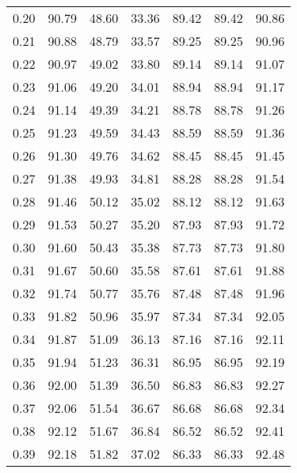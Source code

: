 \begin{tabular}{|c|c|c|c|c|c|c|}
      0.20 &     90.79 &     48.60 &      33.36 &   89.42 &      89.42 &         90.86 \\
      0.21 &     90.88 &     48.79 &      33.57 &   89.25 &      89.25 &         90.96 \\
      0.22 &     90.97 &     49.02 &      33.80 &   89.14 &      89.14 &         91.07 \\
      0.23 &     91.06 &     49.20 &      34.01 &   88.94 &      88.94 &         91.17 \\
      0.24 &     91.14 &     49.39 &      34.21 &   88.78 &      88.78 &         91.26 \\
      0.25 &     91.23 &     49.59 &      34.43 &   88.59 &      88.59 &         91.36 \\
      0.26 &     91.30 &     49.76 &      34.62 &   88.45 &      88.45 &         91.45 \\
      0.27 &     91.38 &     49.93 &      34.81 &   88.28 &      88.28 &         91.54 \\
      0.28 &     91.46 &     50.12 &      35.02 &   88.12 &      88.12 &         91.63 \\
      0.29 &     91.53 &     50.27 &      35.20 &   87.93 &      87.93 &         91.72 \\
      0.30 &     91.60 &     50.43 &      35.38 &   87.73 &      87.73 &         91.80 \\
      0.31 &     91.67 &     50.60 &      35.58 &   87.61 &      87.61 &         91.88 \\
      0.32 &     91.74 &     50.77 &      35.76 &   87.48 &      87.48 &         91.96 \\
      0.33 &     91.82 &     50.96 &      35.97 &   87.34 &      87.34 &         92.05 \\
      0.34 &     91.87 &     51.09 &      36.13 &   87.16 &      87.16 &         92.11 \\
      0.35 &     91.94 &     51.23 &      36.31 &   86.95 &      86.95 &         92.19 \\
      0.36 &     92.00 &     51.39 &      36.50 &   86.83 &      86.83 &         92.27 \\
      0.37 &     92.06 &     51.54 &      36.67 &   86.68 &      86.68 &         92.34 \\
      0.38 &     92.12 &     51.67 &      36.84 &   86.52 &      86.52 &         92.41 \\
      0.39 &     92.18 &     51.82 &      37.02 &   86.33 &      86.33 &         92.48 \\

\end{tabular}
